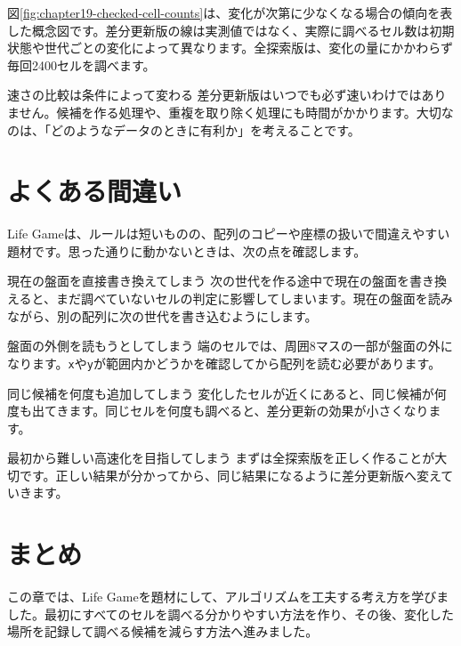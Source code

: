 図\ref{fig:chapter19-checked-cell-counts}は、変化が次第に少なくなる場合の傾向を表した概念図です。差分更新版の線は実測値ではなく、実際に調べるセル数は初期状態や世代ごとの変化によって異なります。全探索版は、変化の量にかかわらず毎回2400セルを調べます。

\begin{notebox}{速さの比較は条件によって変わる}
差分更新版はいつでも必ず速いわけではありません。候補を作る処理や、重複を取り除く処理にも時間がかかります。大切なのは、「どのようなデータのときに有利か」を考えることです。
\end{notebox}

\section{よくある間違い}

Life Gameは、ルールは短いものの、配列のコピーや座標の扱いで間違えやすい題材です。思った通りに動かないときは、次の点を確認します。

\begin{mistakebox}{現在の盤面を直接書き換えてしまう}
次の世代を作る途中で現在の盤面を書き換えると、まだ調べていないセルの判定に影響してしまいます。現在の盤面を読みながら、別の配列に次の世代を書き込むようにします。
\end{mistakebox}

\begin{mistakebox}{盤面の外側を読もうとしてしまう}
端のセルでは、周囲8マスの一部が盤面の外になります。\texttt{x}や\texttt{y}が範囲内かどうかを確認してから配列を読む必要があります。
\end{mistakebox}

\begin{mistakebox}{同じ候補を何度も追加してしまう}
変化したセルが近くにあると、同じ候補が何度も出てきます。同じセルを何度も調べると、差分更新の効果が小さくなります。
\end{mistakebox}

\begin{mistakebox}{最初から難しい高速化を目指してしまう}
まずは全探索版を正しく作ることが大切です。正しい結果が分かってから、同じ結果になるように差分更新版へ変えていきます。
\end{mistakebox}

\section{まとめ}

この章では、Life Gameを題材にして、アルゴリズムを工夫する考え方を学びました。最初にすべてのセルを調べる分かりやすい方法を作り、その後、変化した場所を記録して調べる候補を減らす方法へ進みました。

